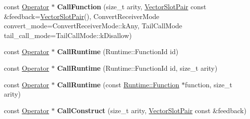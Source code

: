 \begin{DoxyCompactItemize}
\item 
const \hyperlink{classv8_1_1internal_1_1compiler_1_1_operator}{Operator} $\ast$ {\bfseries Call\+Function} (size\+\_\+t arity, \hyperlink{classv8_1_1internal_1_1compiler_1_1_vector_slot_pair}{Vector\+Slot\+Pair} const \&feedback=\hyperlink{classv8_1_1internal_1_1compiler_1_1_vector_slot_pair}{Vector\+Slot\+Pair}(), Convert\+Receiver\+Mode convert\+\_\+mode=Convert\+Receiver\+Mode\+::k\+Any, Tail\+Call\+Mode tail\+\_\+call\+\_\+mode=Tail\+Call\+Mode\+::k\+Disallow)\hypertarget{classv8_1_1internal_1_1compiler_1_1_j_s_operator_builder_a4a0cd98d4a95355ade9d740e1927d531}{}\label{classv8_1_1internal_1_1compiler_1_1_j_s_operator_builder_a4a0cd98d4a95355ade9d740e1927d531}

\item 
const \hyperlink{classv8_1_1internal_1_1compiler_1_1_operator}{Operator} $\ast$ {\bfseries Call\+Runtime} (Runtime\+::\+Function\+Id id)\hypertarget{classv8_1_1internal_1_1compiler_1_1_j_s_operator_builder_a32b23e8c3191825588354e3bf73ce8a4}{}\label{classv8_1_1internal_1_1compiler_1_1_j_s_operator_builder_a32b23e8c3191825588354e3bf73ce8a4}

\item 
const \hyperlink{classv8_1_1internal_1_1compiler_1_1_operator}{Operator} $\ast$ {\bfseries Call\+Runtime} (Runtime\+::\+Function\+Id id, size\+\_\+t arity)\hypertarget{classv8_1_1internal_1_1compiler_1_1_j_s_operator_builder_ad87250c4cebf6dbe56c4ed8129a60e8a}{}\label{classv8_1_1internal_1_1compiler_1_1_j_s_operator_builder_ad87250c4cebf6dbe56c4ed8129a60e8a}

\item 
const \hyperlink{classv8_1_1internal_1_1compiler_1_1_operator}{Operator} $\ast$ {\bfseries Call\+Runtime} (const \hyperlink{structv8_1_1internal_1_1_runtime_1_1_function}{Runtime\+::\+Function} $\ast$function, size\+\_\+t arity)\hypertarget{classv8_1_1internal_1_1compiler_1_1_j_s_operator_builder_a68c5de1623439fab619f458caccc3c26}{}\label{classv8_1_1internal_1_1compiler_1_1_j_s_operator_builder_a68c5de1623439fab619f458caccc3c26}

\item 
const \hyperlink{classv8_1_1internal_1_1compiler_1_1_operator}{Operator} $\ast$ {\bfseries Call\+Construct} (size\+\_\+t arity, \hyperlink{classv8_1_1internal_1_1compiler_1_1_vector_slot_pair}{Vector\+Slot\+Pair} const \&feedback)\hypertarget{classv8_1_1internal_1_1compiler_1_1_j_s_operator_builder_ac105559d88dba2364ad4062939044a67}{}\label{classv8_1_1internal_1_1compiler_1_1_j_s_operator_builder_ac105559d88dba2364ad4062939044a67}


\end{DoxyCompactItemize}
